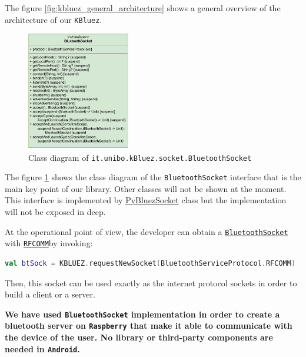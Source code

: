 The figure \ref{fig:kbluez_general_architecture} shows a general overview of the architecture of our \texttt{KBluez}.

\begin{figure}[h!]
	\centering
	\includegraphics[width=0.4\textwidth]{img/uml_bluetooth_socket_interface.pdf}
	\caption{Class diagram of \texttt{it.unibo.kBluez.socket.BluetoothSocket}}
	\label{fig:uml_bluetooth_socket_interface}
\end{figure}

The figure \ref{fig:uml_bluetooth_socket_interface} shows the class diagram of the \texttt{BluetoothSocket} interface that is the main key point of our library. Other classes will not be shown at the moment.
This interface is implemented by \href{https://github.com/LM-96/MobileSystemProject/blob/main/kBluez/lib/src/main/kotlin/it/unibo/kBluez/pybluez/PyBluezSocket.kt}{PyBluezSocket} class but the implementation will not be exposed in deep.

At the operational point of view, the developer can obtain a \href{https://github.com/LM-96/MobileSystemProject/blob/main/kBluez/lib/src/main/kotlin/it/unibo/kBluez/socket/BluetoothSocket.kt}{\texttt{BluetoothSocket}} with \href{https://en.wikipedia.org/wiki/List_of_Bluetooth_protocols#Radio_frequency_communication_(RFCOMM)}{\texttt{RFCOMM}}by invoking:
\begin{lstlisting}[language=Kotlin]
	val btSock = KBLUEZ.requestNewSocket(BluetoothServiceProtocol.RFCOMM)
\end{lstlisting}
Then, this socket can be used exactly as the internet protocol sockets in order to build a client or a server.

\begin{tcolorbox}
	\begin{center}
		\textbf{We have used \texttt{BluetoothSocket} implementation in order to create a bluetooth server on \texttt{Raspberry} that make it able to communicate with the device of the user. No library or third-party components are needed in \texttt{Android}.}
	\end{center}
\end{tcolorbox}

